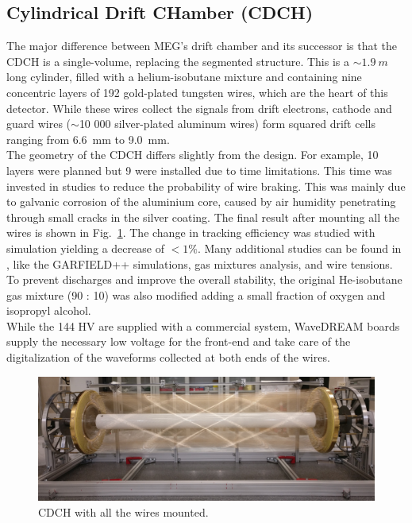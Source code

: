 \begin{refsection}
    \subsection{Cylindrical Drift CHamber (CDCH)}
        The major difference between MEG's drift chamber and its successor is that the CDCH is a single-volume, replacing the segmented structure.
        This is a $\sim\SI{1.9}{m}$ long cylinder, filled with a helium-isobutane mixture and containing nine concentric layers of 192 gold-plated tungsten wires, which are the heart of this detector.
        While these wires collect the signals from drift electrons, cathode and guard wires ($\sim$10 000 silver-plated aluminum wires) form squared drift cells ranging from \SI{6.6}{mm} to \SI{9.0}{mm}.\\
        The geometry of the CDCH differs slightly from the design.
        For example, 10 layers were planned but 9 were installed due to time limitations. This time was invested in studies to reduce the probability of wire braking.
        This was mainly due to galvanic corrosion of the aluminium core, caused by air humidity penetrating through small cracks in the silver coating.
        The final result after mounting all the wires is shown in Fig.~\ref{fig:MEGII:CDCH}.
        The change in tracking efficiency was studied with simulation yielding a decrease of $< 1\%$.
        Many additional studies can be found in \cite{MEG_II:detector}, like the GARFIELD++ simulations, gas mixtures analysis, and wire tensions.
        To prevent discharges and improve the overall stability, the original He-isobutane gas mixture (90 : 10) was also modified adding a small fraction of oxygen and isopropyl alcohol.\\
        While the 144 HV are supplied with a commercial system, WaveDREAM boards supply the necessary low voltage for the front-end and take care of the digitalization of the waveforms collected at both ends of the wires.

        \begin{figure}
            \centering
            \includegraphics[width = \textwidth]{Figures/MEG/CDCH.png}
            \caption{CDCH with all the wires mounted.}
            \label{fig:MEGII:CDCH}
        \end{figure}


\end{refsection}
